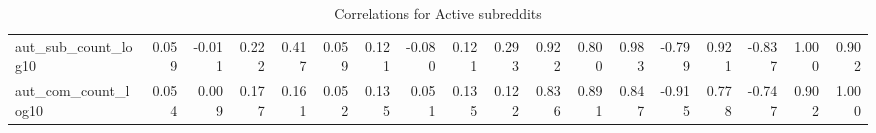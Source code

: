 \begin{table}
\begin{tabular}{lrrrrrrrrrrrrrrrrr}
aut\_sub\_count\_log10 &         0.059 &         -0.011 &    0.222 &  0.417 &  0.059 &               0.121 &               -0.080 &        0.121 &         0.293 &          0.922 &          0.800 &            0.983 &        -0.799 &         0.921 &     -0.837 &                1.000 &                0.902 \\
aut\_com\_count\_log10 &         0.054 &          0.009 &    0.177 &  0.161 &  0.052 &               0.135 &                0.051 &        0.135 &         0.122 &          0.836 &          0.891 &            0.847 &        -0.915 &         0.778 &     -0.747 &                0.902 &                1.000 \\
\bottomrule
\end{tabular}
\caption{Correlations for Active subreddits}
\label{table/corr:active}
\end{table}